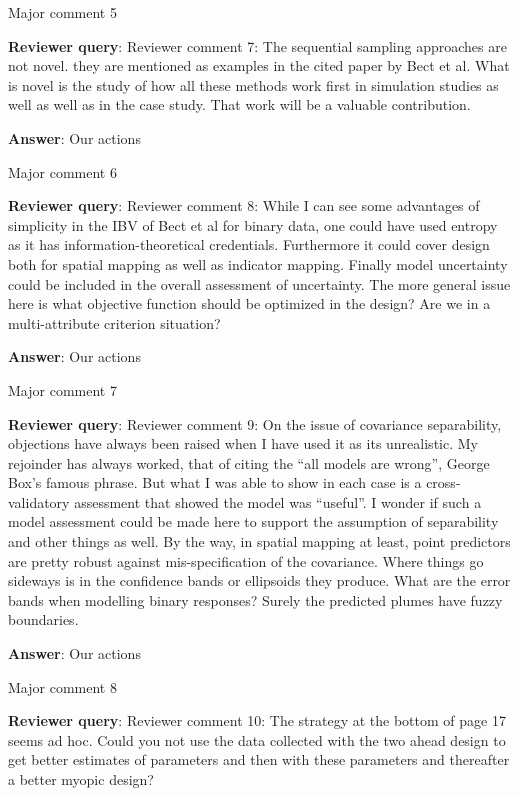 \documentclass[a4paper]{article}
\def\reply{\textbf{Reviewer query}}
\def\action{\textbf{Answer}}
\begin{document}
\begin{answers}
\item{Major comment 5}\label{q5}

\reply: Reviewer comment 7: The sequential sampling approaches are not novel. they are mentioned as examples in the cited paper by Bect et al. What is novel is the study of how all these methods work first in simulation studies as well as well as in the case study. That work will be a valuable contribution.

\action: Our actions

\item{Major comment 6}\label{q6}

\reply: Reviewer comment 8: While I can see some advantages of simplicity in the IBV of Bect et al for binary data, one could have used entropy as it has information-theoretical credentials. Furthermore it could cover design both for spatial mapping as well as indicator mapping. Finally model uncertainty could be included in the overall assessment of uncertainty. The more general issue here is what objective function should be optimized in the design? Are we in a multi-attribute criterion situation?

\action: Our actions

\item{Major comment 7}\label{q7}

\reply: Reviewer comment 9: On the issue of covariance separability, objections have always been raised when I have used it as its unrealistic. My rejoinder has always worked, that of citing the “all models are wrong”, George Box’s famous phrase. But what I was able to show in each case is a cross-validatory assessment that showed the model was “useful”. I wonder if such a model assessment could be made here to support the assumption of separability and other things as well. By the way, in spatial mapping at least, point predictors are pretty robust against mis-specification of the covariance. Where things go sideways is in the confidence bands or ellipsoids they produce. What are the error bands when modelling binary responses? Surely the predicted plumes have fuzzy boundaries. 

\action: Our actions

\item{Major comment 8}\label{q8}

\reply: Reviewer comment 10: The strategy at the bottom of page 17 seems ad hoc. Could you not use the data collected with the two ahead design to get better estimates of parameters and then with these parameters and thereafter a better myopic design?


\end{answers}
\end{document}
